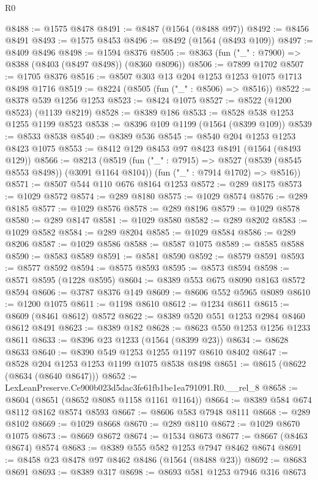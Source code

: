 \begin{lexlean}{R0}
\begin{coremodule}
@8488 := @1575 @8478
@8491 := @8487 (@1564 (@8488 @97))
@8492 := @8456 @8491
@8493 := @1575 @8453
@8496 := @8492 (@1564 (@8493 @109))
@8497 := @8409 @8496
@8498 := @1594 @8376
@8505 := @8363 (fun ("_" : @7900) => @8388 (@8403 (@8497 @8498)) (@8360 @8096))
@8506 := @7899 @1702
@8507 := @1705 @8376
@8516 := @8507 @303 @13 @204 @1253 @1253 @1075 @1713 @8498 @1716
@8519 := @8224 (@8505 (fun ("_" : @8506) => @8516))
@8522 := @8378 @539 @1256 @1253
@8523 := @8424 @1075
@8527 := @8522 (@1200 @8523) (@1139 @8219)
@8528 := @8389 @186
@8533 := @8528 @538 @1253 @1255 @1199 @8523
@8538 := @8396 @109 @1199 (@1564 (@8399 @109))
@8539 := @8533 @8538
@8540 := @8389 @536
@8545 := @8540 @204 @1253 @1253 @8423 @1075
@8553 := @8412 @129 @8453 @97 @8423 @8491 (@1564 (@8493 @129))
@8566 := @8213
    (@8519
      (fun ("_" : @7915) => @8527 (@8539 (@8545 @8553 @8498)) (@3091 @1164 @8104))
      (fun ("_" : @7914 @1702) => @8516))
@8571 := @8507 @544 @110 @676 @8164 @1253
@8572 := @289 @8175
@8573 := @1029 @8572
@8574 := @289 @8180
@8575 := @1029 @8574
@8576 := @289 @8185
@8577 := @1029 @8576
@8578 := @289 @8196
@8579 := @1029 @8578
@8580 := @289 @8147
@8581 := @1029 @8580
@8582 := @289 @8202
@8583 := @1029 @8582
@8584 := @289 @8204
@8585 := @1029 @8584
@8586 := @289 @8206
@8587 := @1029 @8586
@8588 := @8587 @1075
@8589 := @8585 @8588
@8590 := @8583 @8589
@8591 := @8581 @8590
@8592 := @8579 @8591
@8593 := @8577 @8592
@8594 := @8575 @8593
@8595 := @8573 @8594
@8598 := @8571 @8595 (@1228 @8595)
@8604 := @8389 @553 @675 @8090 @8163 @8572 @8594
@8606 := @3787 @8376 @149
@8609 := @8606 @552 @5965 @8089
@8610 := @1200 @1075
@8611 := @1198 @8610
@8612 := @1234 @8611
@8615 := @8609 (@8461 @8612) @8572
@8622 := @8389 @520 @551 @1253 @2984 @8460 @8612 @8491
@8623 := @8389 @182
@8628 := @8623 @550 @1253 @1256 @1233 @8611
@8633 := @8396 @23 @1233 (@1564 (@8399 @23))
@8634 := @8628 @8633
@8640 := @8390 @549 @1253 @1255 @1197 @8610 @8402
@8647 := @8528 @204 @1253 @1253 @1199 @1075 @8538 @8498
@8651 := @8615 (@8622 (@8634 (@8640 @8647)))
@8652 := LexLeanPreserve.Ce900b023d5dac3fe61fb1be1ea791091.R0.__rel_8
@8658 := @8604 (@8651 (@8652 @8085 @1158 @1161 @1164))
@8664 := @8389 @584 @674 @8112 @8162 @8574 @8593
@8667 := @8606 @583 @7948 @8111
@8668 := @289 @8102
@8669 := @1029 @8668
@8670 := @289 @8110
@8672 := @1029 @8670 @1075
@8673 := @8669 @8672
@8674 := @1534 @8673
@8677 := @8667 (@8463 @8674) @8574
@8683 := @8389 @555 @582 @1253 @7947 @8462 @8674
@8691 := @8458 @23 @8478 @97 @8462 @8486 (@1564 (@8488 @23))
@8692 := @8683 @8691
@8693 := @8389 @317
@8698 := @8693 @581 @1253 @7946 @316 @8673

\end{coremodule}
\end{lexlean}
